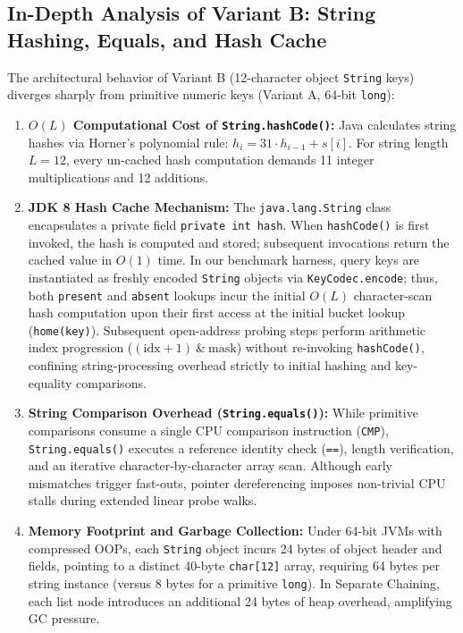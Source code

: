 \documentclass[twocolumn, 10pt, a4paper]{article}
\begin{document}
\subsection{In-Depth Analysis of Variant B: String Hashing, Equals, and Hash Cache}
The architectural behavior of Variant B (12-character object \texttt{String} keys) diverges sharply from primitive numeric keys (Variant A, 64-bit \texttt{long}):
\begin{enumerate}
    \item \textbf{$O(L)$ Computational Cost of \texttt{String.hashCode()}:} Java calculates string hashes via Horner's polynomial rule: $h_i = 31 \cdot h_{i-1} + s[i]$. For string length $L=12$, every un-cached hash computation demands 11 integer multiplications and 12 additions.
    \item \textbf{JDK 8 Hash Cache Mechanism:} The \texttt{java.lang.String} class encapsulates a private field \texttt{private int hash}. When \texttt{hashCode()} is first invoked, the hash is computed and stored; subsequent invocations return the cached value in $O(1)$ time. In our benchmark harness, query keys are instantiated as freshly encoded \texttt{String} objects via \texttt{KeyCodec.encode}; thus, both \texttt{present} and \texttt{absent} lookups incur the initial $O(L)$ character-scan hash computation upon their first access at the initial bucket lookup (\texttt{home(key)}). Subsequent open-address probing steps perform arithmetic index progression ($(\text{idx}+1)\ \&\ \text{mask}$) without re-invoking \texttt{hashCode()}, confining string-processing overhead strictly to initial hashing and key-equality comparisons.
    \item \textbf{String Comparison Overhead (\texttt{String.equals()}):} While primitive comparisons consume a single CPU comparison instruction (\texttt{CMP}), \texttt{String.equals()} executes a reference identity check (\texttt{==}), length verification, and an iterative character-by-character array scan. Although early mismatches trigger fast-outs, pointer dereferencing imposes non-trivial CPU stalls during extended linear probe walks.
    \item \textbf{Memory Footprint and Garbage Collection:} Under 64-bit JVMs with compressed OOPs, each \texttt{String} object incurs 24 bytes of object header and fields, pointing to a distinct 40-byte \texttt{char[12]} array, requiring 64 bytes per string instance (versus 8 bytes for a primitive \texttt{long}). In Separate Chaining, each list node introduces an additional 24 bytes of heap overhead, amplifying GC pressure.
\end{enumerate}
\end{document}
